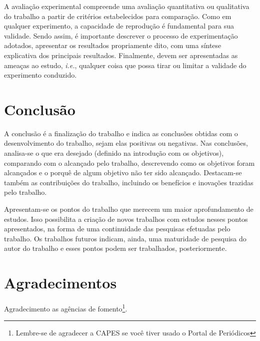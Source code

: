 \documentclass[12pt]{article}
\begin{document}
	A avaliação experimental compreende uma avaliação quantitativa ou qualitativa do trabalho a partir de critérios estabelecidos para comparação. Como em qualquer experimento, a capacidade de reprodução é fundamental para sua validade. Sendo assim, é importante descrever o processo de experimentação adotados, apresentar os resultados propriamente dito, com uma síntese explicativa dos principais resultados. Finalmente, devem ser apresentadas as ameaças ao estudo, \emph{i.e.}, qualquer coisa que possa tirar ou limitar a validade do experimento conduzido. 
	
	\section{Conclusão}
	\label{sec_conclusao}
	
	A conclusão é a finalização do trabalho e indica as conclusões obtidas com o desenvolvimento do trabalho, sejam elas positivas ou negativas. Nas conclusões, analisa-se o que era desejado (definido na introdução com os objetivos), comparando com o alcançado pelo trabalho, descrevendo como os objetivos foram alcançados e o porquê de algum objetivo não ter sido alcançado. Destacam-se também as contribuições do trabalho, incluindo os benefícios e inovações trazidas pelo trabalho.
	
	Apresentam-se os pontos do trabalho que merecem um maior aprofundamento de estudos. Isso possibilita a criação de novos trabalhos com estudos nesses pontos apresentados, na forma de uma continuidade das pesquisas efetuadas pelo trabalho. Os trabalhos futuros indicam, ainda, uma maturidade de pesquisa do autor do trabalho e esses pontos podem ser trabalhados, posteriormente.
	
	\section*{Agradecimentos}
	Agradecimento as agências de fomento\footnote{Lembre-se de agradecer a CAPES se você tiver usado o Portal de Periódicos}.
	
    
	
	
\end{document}
